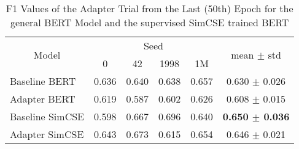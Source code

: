 \begin{table}[!t]
    \centering
    \caption{F1 Values of the Adapter Trial from the Last (50th) Epoch for the general BERT Model and
             the supervised SimCSE trained BERT}
    \label{tab:my-adapt}
    \begin{tabular}{|l||cccc|c|}
    \hline
    \multicolumn{1}{|c||}{\multirow{2}{*}{Model}} & \multicolumn{4}{c|}{Seed}                                                                    & \multirow{2}{*}{mean $\pm$ std} \\ \cline{2-5}
    \multicolumn{1}{|c||}{}                       & \multicolumn{1}{c|}{0}     & \multicolumn{1}{c|}{42}    & \multicolumn{1}{c|}{1998}  & 1M    &                                 \\ \hline\hline
    Baseline BERT                                 & \multicolumn{1}{c|}{0.636} & \multicolumn{1}{c|}{0.640} & \multicolumn{1}{c|}{0.638} & 0.657 & 0.630 $\pm$ 0.026               \\ \hline
    Adapter BERT                                  & \multicolumn{1}{c|}{0.619} & \multicolumn{1}{c|}{0.587} & \multicolumn{1}{c|}{0.602} & 0.626 & 0.608 $\pm$ 0.015               \\ \hline
    Baseline SimCSE                               & \multicolumn{1}{c|}{0.598} & \multicolumn{1}{c|}{0.667} & \multicolumn{1}{c|}{0.696} & 0.640 & \textbf{0.650 $\pm$ 0.036}               \\ \hline
    Adapter SimCSE                                & \multicolumn{1}{c|}{0.643} & \multicolumn{1}{c|}{0.673} & \multicolumn{1}{c|}{0.615} & 0.654 & 0.646 $\pm$ 0.021      \\ \hline
    \end{tabular}
\end{table}

